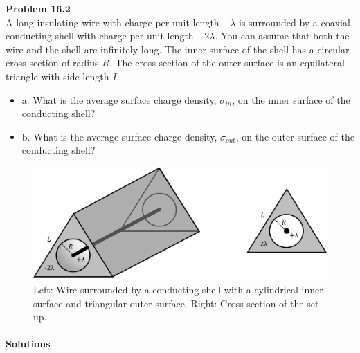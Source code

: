 \begin{framed}
\textbf{Problem 16.2}\\
A long insulating wire with charge per unit length $+\lambda$ is surrounded by a coaxial conducting shell with charge per unit length $-2\lambda$. You can assume that both the wire and the shell are infinitely long. The inner surface of the shell has a circular cross section of radius $R$. The cross section of the outer surface is an equilateral triangle with side length $L$.

\begin{itemize}
\item a. What is the average surface charge density, $\sigma_{in}$, on the inner surface of the conducting shell?
\item b. What is the average surface charge density, $\sigma_{out}$, on the outer surface of the conducting shell?
\end{itemize}

\begin{figure}[!htbp]
\centering
\includegraphics[width=0.8\linewidth]{files/coaxial_triangle-ae2491e601ad23ad3a7ca4bfe406a2d7.png}
\caption[]{Left: Wire surrounded by a conducting shell with a cylindrical inner surface and triangular outer surface. Right: Cross section of the set-up.}
\label{fig:gauss:coaxial_triangle}
\end{figure}
\end{framed}

\paragraph{Solutions}

